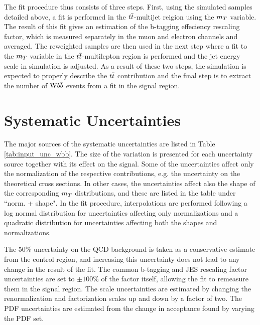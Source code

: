 The fit procedure thus consists of three steps.
First, using the simulated samples detailed above,
 a fit is performed in the $t\overline{t}$-multijet reigion
 using the $m_T$ variable.
The result of this fit gives an estimation of the
 b-tagging effeciency rescaling factor, which
 is measured separately in the muon and electron
 channels and averaged. %
The reweighted samples are then used in the next step
 where a fit to the $m_T$ variable in the
 $t\overline{t}$-multilepton region is performed and
 the jet energy scale in simulation is adjusted.
As a result of these two steps, the simulation is
 expected to properly describe the $t\overline{t}$ contribution
 and the final step is to extract the number of
 $\mathrm{W} b\overline{b}$ events from a fit in the signal region.

\section{Systematic Uncertainties}
The major sources of the systematic uncertainties are listed in Table \ref{tab:input_unc_wbb}.
 The size of the variation is presented for each uncertainty source
 together with its effect
 on the signal.
Some of the uncertainties affect
 only the normalization of the respective contributions,
 e.g. the uncertainty on the
 theoretical cross sections.
In other cases, the uncertainties affect also the
 shape of the corresponding $m_T$ distributions,
 and these are listed in
 the table under ``norm. + shape".
In the fit procedure, interpolations are performed following a log
 normal distribution for uncertainties affecting only normalizations
 and a quadratic distribution for uncertainties affecting both the shapes and normalizations.

The 50\% uncertainty on the QCD background is taken as a conservative estimate from
 the control region, and increasing this uncertainty does not lead to any change
 in the result of the fit.
The common b-tagging and JES rescaling factor uncertainties
 are set to $\pm100\%$ of the factor itself, allowing the fit to
 remeasure them in the signal region.
The scale uncertainties are estimated by
 changing the renormalization and factorization scales
 up and down by a factor of two.
The PDF uncertainties are estimated from the change in
 acceptance found by varying the
 PDF set.

